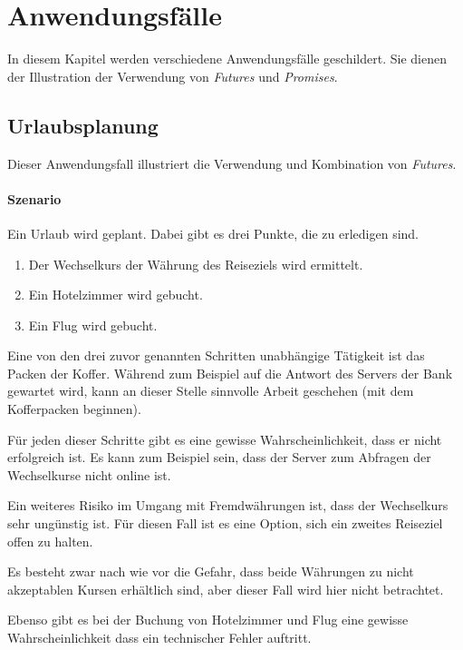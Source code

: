\section{Anwendungsfälle}

In diesem Kapitel werden verschiedene Anwendungsfälle geschildert.
Sie dienen der Illustration der Verwendung von \emph{Futures} und
\emph{Promises}.

\subsection{Urlaubsplanung}

Dieser Anwendungsfall illustriert die Verwendung und Kombination
von \emph{Futures}.

\paragraph{Szenario}

Ein Urlaub wird geplant. Dabei gibt es drei Punkte, die zu erledigen sind.

\begin{enumerate}
\item Der Wechselkurs der Währung des Reiseziels wird ermittelt.
\item Ein Hotelzimmer wird gebucht.
\item Ein Flug wird gebucht.
\end{enumerate}

Eine von den drei zuvor genannten Schritten unabhängige Tätigkeit ist
das Packen der Koffer. Während zum Beispiel auf die Antwort des Servers 
der Bank gewartet wird, kann an dieser Stelle sinnvolle Arbeit geschehen 
(mit dem Kofferpacken beginnen).

Für jeden dieser Schritte gibt es eine gewisse Wahrscheinlichkeit, 
dass er nicht erfolgreich ist. Es kann zum Beispiel sein, dass der 
Server zum Abfragen der Wechselkurse nicht online ist.

Ein weiteres Risiko im Umgang mit Fremdwährungen ist, dass der 
Wechselkurs sehr ungünstig ist. Für diesen Fall ist es eine Option,
sich ein zweites Reiseziel offen zu halten.

Es besteht zwar nach wie vor die Gefahr, dass beide Währungen zu nicht
akzeptablen Kursen erhältlich sind, aber dieser Fall wird hier nicht 
betrachtet.

Ebenso gibt es bei der Buchung von Hotelzimmer und Flug eine gewisse 
Wahrscheinlichkeit dass ein technischer Fehler auftritt.

